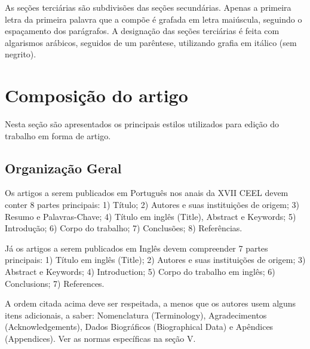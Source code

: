 \documentclass{ceel}
\begin{document}
\begin{multicols}{2}
As seções terciárias são subdivisões das seções secundárias. Apenas a primeira letra da primeira palavra que a compõe é grafada em letra maiúscula, seguindo o espaçamento dos parágrafos. A designação das seções terciárias é feita com algarismos arábicos, seguidos de um parêntese, utilizando grafia em itálico (sem negrito).
\section{Composição do artigo}
Nesta seção são apresentados os principais estilos utilizados para edição do trabalho em forma de artigo.
\subsection{Organização Geral}
Os artigos a serem publicados em Português nos anais da XVII CEEL devem conter 8 partes principais: 1) Título; 2) Autores e suas instituições de origem; 3) Resumo e Palavras-Chave; 4) Título em inglês (Title), Abstract e Keywords; 5) Introdução; 6) Corpo do trabalho; 7) Conclusões; 8) Referências. 

Já os artigos a serem publicados em Inglês devem compreender 7 partes principais: 1) Título em inglês (Title); 2) Autores e suas instituições de origem; 3) Abstract e Keywords; 4) Introduction; 5) Corpo do trabalho em inglês; 6) Conclusions; 7) References. 

A ordem citada acima deve ser respeitada, a menos que os autores usem alguns itens adicionais, a saber: Nomenclatura (Terminology), Agradecimentos (Acknowledgements), Dados Biográficos (Biographical Data) e Apêndices (Appendices). Ver as normas específicas na seção V. 


\end{multicols}
\end{document}
